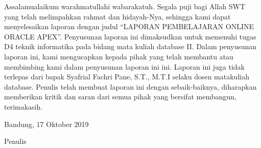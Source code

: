 \begin{acknowledgements}
\par
Assalamualaikum warahmatullahi wabarakatuh. Segala puji bagi Allah SWT yang telah melimpahkan rahmat dan hidayah-Nya, sehingga kami dapat menyelesaikan laporan dengan judul “LAPORAN PEMBELAJARAN ONLINE ORACLE APEX”.
Penyusunan laporan ini dimaksudkan untuk memenuhi tugas D4 teknik informatika pada bidang mata kuliah database II. Dalam penyusunan laporan ini, kami mengucapkan kepada pihak yang telah membantu atau membimbing kami dalam penyusunan laporan ini ini. Laporan ini juga tidak terlepas dari bapak Syafrial Fachri Pane, S.T., M.T.I selaku dosen matakuliah database. Penulis telah membuat laporan ini dengan sebaik-baiknya, diharapkan memberikan kritik dan saran dari semua pihak yang bersifat membangun, terimakasih.

\begin{raggedleft}












Bandung, 17 Oktober 2019

Penulis

\end{raggedleft}

\end{acknowledgements}